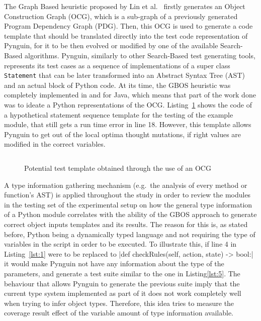 \documentclass[%
  chapterprefix=false,%
  open=right,%
  twoside=true,%
  paper=a4,%
  logofile={Figures/logo.png},%
  thesistype=master,%
  UKenglish,%
]{se2thesis}
\newcommand{\classname}[1]{\texttt{#1}}
\begin{document}
The Graph Based heuristic proposed by Lin et al.~\cite{DBLP:conf/sigsoft/0001O00D21} firstly generates an Object Construction Graph (OCG), which is a sub-graph of a previously generated Program Dependency Graph (PDG).
Then, this OCG is used to generate a code template that should be translated directly into the test code representation of Pynguin, for it to be then evolved or modified by one of the available Search-Based algorithms.
Pynguin, similarly to other Search-Based test generating tools, represents its test cases as a sequence of implementations of a super class \classname{Statement} that can be later transformed into an Abstract Syntax Tree (AST) and an actual block of Python code.
At its time, the GBOS heuristic was completely implemented in and for Java, which means that part of the work done was to ideate a Python representations of the OCG.\@
Listing~\ref{lst:4} shows the code of a hypothetical statement sequence template for the testing of the example module, that still gets a run time error in line 18.
However, this template allows Pynguin to get out of the local optima thought mutations, if right values are modified in the correct variables.

\begin{figure}
  \inputminted[linenos]{python}{Figures/template.py}
  \caption{Potential test template obtained through the use of an OCG\label{lst:4}}
\end{figure}

A type information gathering mechanism (e.g.~the analysis of every method or function's AST) is applied throughout the study in order to review the modules in the testing set of the experimental setup on how the general type information of a Python module correlates with the ability of the GBOS approach to generate correct object inputs templates and its results.
The reason for this is, as stated before, Python being a dynamically typed language and not requiring the type of variables in the script in order to be executed.
To illustrate this, if line 4 in Listing~\ref{lst:1} were to be replaced to |def checkRules(self, action, state) -> bool:| it would make Pynguin not have any information about the type of the parameters, and generate a test suite similar to the one in Listing\ref{lst:5}.
The behaviour that allows Pynguin to generate the previous suite imply that the current type system implemented as part of it does not work completely well when trying to infer object types.
Therefore, this idea tries to measure the coverage result effect of the variable amount of type information available.
\end{document}
